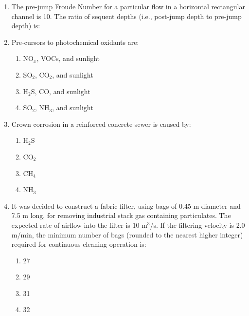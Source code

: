 \documentclass[journal]{IEEEtran}
\begin{document}
\begin{enumerate}
    \item The pre-jump Froude Number for a particular flow in a horizontal rectangular channel is 10. The ratio of sequent depths (i.e., post-jump depth to pre-jump depth) is:
        

    \item Pre-cursors to photochemical oxidants are:
        \begin{enumerate}
            \item  NO$_x$, VOCs, and sunlight
            \item  SO$_2$, CO$_2$, and sunlight
            \item  H$_2$S, CO, and sunlight
            \item  SO$_2$, NH$_3$, and sunlight
        \end{enumerate}

    \item Crown corrosion in a reinforced concrete sewer is caused by:
    \begin{multicols}{4}
        
        \begin{enumerate}
            \item  H$_2$S
            \item  CO$_2$
            \item  CH$_4$
            \item  NH$_3$
        \end{enumerate}
            \end{multicols}


    \item It was decided to construct a fabric filter, using bags of 0.45 m diameter and 7.5 m long, for removing industrial stack gas containing particulates. The expected rate of airflow into the filter is 10 m$^3$/s. If the filtering velocity is 2.0 m/min, the minimum number of bags (rounded to the nearest higher integer) required for continuous cleaning operation is:
    \begin{multicols}{4}
        
        \begin{enumerate}
            \item  27
            \item  29
            \item  31
            \item  32
        \end{enumerate}
            \end{multicols}



\end{enumerate}
\end{document}
